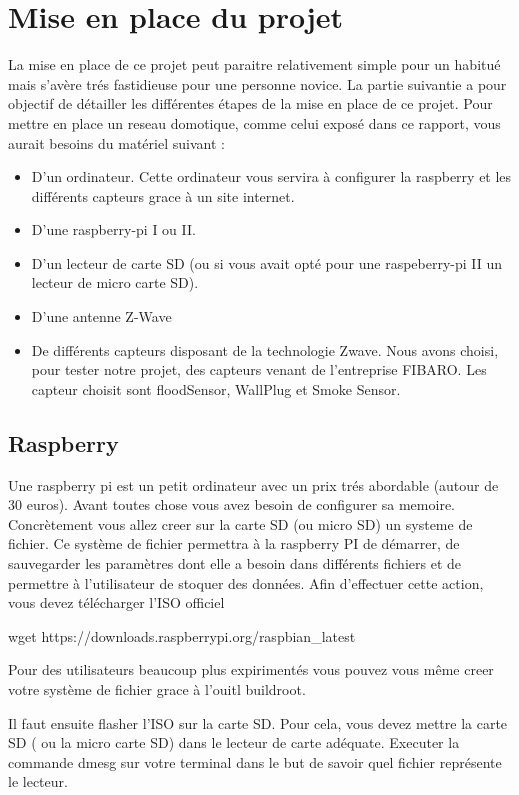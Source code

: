 \chapter{Mise en place du projet}
La mise en place de ce projet peut paraitre relativement simple pour un habitué mais s'avère trés fastidieuse pour une personne novice.
La partie suivantie a pour objectif de détailler les différentes étapes de la mise en place de ce projet.
Pour mettre en place un reseau domotique, comme celui exposé dans ce rapport, vous aurait besoins du matériel suivant :

\begin{itemize}
	\item D'un  ordinateur. Cette ordinateur vous servira à configurer la raspberry et  les différents capteurs grace à un site internet.
	\item D'une raspberry-pi I ou II. 
	\item D'un lecteur de carte SD (ou si vous avait opté pour une raspeberry-pi II un lecteur de micro carte SD).
	\item D'une antenne Z-Wave
	\item De différents capteurs disposant de la technologie Zwave. Nous avons choisi, pour tester notre projet, des capteurs venant de l'entreprise FIBARO. Les capteur choisit sont floodSensor, WallPlug et Smoke Sensor.
\end{itemize}

\section{Raspberry}
Une raspberry pi est un petit ordinateur avec un prix trés abordable (autour de 30 euros).
Avant toutes chose vous avez besoin de configurer sa memoire. Concrètement vous allez creer sur la carte SD (ou micro SD) un systeme de fichier.
Ce système de fichier permettra à la raspberry PI de démarrer, de sauvegarder les paramètres dont elle a besoin dans différents fichiers et de permettre à l'utilisateur de stoquer des données.
Afin d'effectuer cette action, vous devez télécharger l'ISO officiel 

wget https://downloads.raspberrypi.org/raspbian_latest

Pour des utilisateurs beaucoup plus expirimentés vous pouvez vous même creer votre système de fichier grace à l'ouitl buildroot.

Il faut ensuite flasher l'ISO sur la carte SD. Pour cela, vous devez mettre la carte SD ( ou la micro carte SD) dans le lecteur de carte adéquate. 
Executer la commande dmesg sur votre terminal dans le but de savoir quel fichier représente le lecteur.

